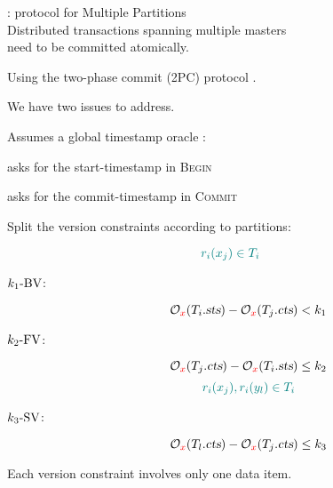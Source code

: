 \begin{frame}{}
  \begin{center}
    \rvsimp{}: \rvsi{} protocol for Multiple Partitions\\[10pt]
    Distributed transactions spanning multiple masters \\
    need to be committed atomically.

    \pause
    \vspace{0.40cm}
    Using the two-phase commit (2PC) protocol .

    \pause
    \vspace{1.00cm}
    We have two issues to address.
  \end{center}
\end{frame}

\begin{frame}{}
  Assumes a global timestamp oracle :
  \begin{description}[Coordinator:]
    \item[Client:] asks for the start-timestamp in \textsc{Begin}
    \item[Coordinator:] asks for the commit-timestamp in \textsc{Commit}
  \end{description}
\end{frame}

\begin{frame}{}
  Split the \rvsi{} version constraints according to partitions:

  \[
    \textcolor{teal}{r_i(x_j) \in T_i}
  \]
  \vspace{-0.40cm}
  \begin{description}
    \item[$k_1\text{-BV}$:]
      \[
	\mathcal{O}_{\textcolor{red}{x}}(T_i.\textsl{sts}) - \mathcal{O}_{\textcolor{red}{x}}(T_j.\textsl{cts}) < k_1
      \]
    \item[$k_2\text{-FV}$:]
      \[
	\mathcal{O}_{\textcolor{red}{x}}(T_j.\textsl{cts}) - \mathcal{O}_{\textcolor{red}{x}}(T_i.\textsl{sts}) \le k_2
      \]
      \vspace{0.20cm}
      \[
	\textcolor{teal}{r_i(x_j), r_i(y_l) \in T_i}
      \]
    \item[$k_3\text{-SV}$:]
      \[
	\mathcal{O}_{\textcolor{red}{x}}(T_l.\textsl{cts}) - \mathcal{O}_{\textcolor{red}{x}}(T_j.\textsl{cts}) \le k_3
      \]
  \end{description}

  \vspace{0.6cm}
  \centerline{Each version constraint involves only one data item.}
\end{frame}
